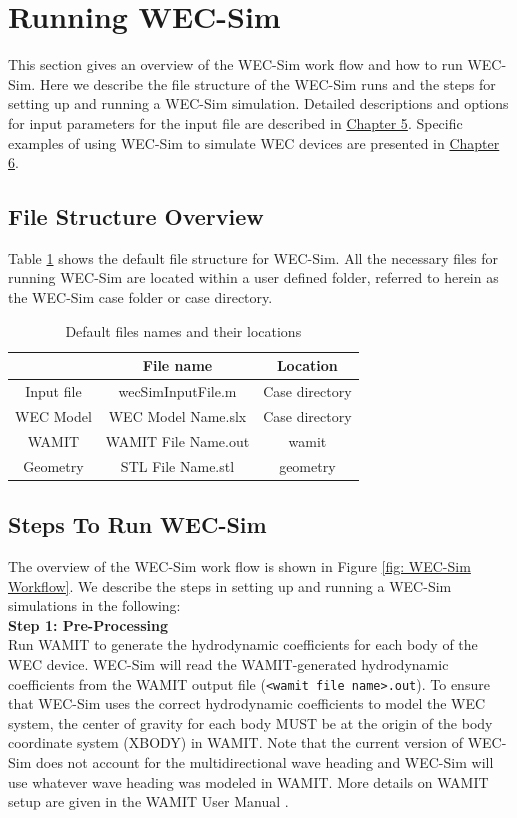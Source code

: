 \section{Running WEC-Sim} \label{sec:running}
This section gives an overview of the WEC-Sim work flow and how to run WEC-Sim. Here we describe the file structure of the WEC-Sim runs and the steps for setting up and running a WEC-Sim simulation. Detailed descriptions and options for input parameters for the input file are described in \hyperlink{chapter.5}{Chapter 5}. Specific examples of using WEC-Sim to simulate WEC devices are presented in \hyperlink{chapter.6}{Chapter 6}. 

\subsection{File Structure Overview} \label{sec:fileStructure}
Table \ref{Table: List of default file name and location} shows the default file structure for WEC-Sim. All the necessary files for running WEC-Sim are located within a user defined folder, referred to herein as the WEC-Sim case folder or case directory.

\begin{table}[H]
\noindent \centering{}
\protect\caption{Default files names and their locations}
\begin{tabular}{|c|c|c|}
\hline 
 & \textbf{File name} & \textbf{Location}\tabularnewline
\hline 
Input file & wecSimInputFile.m & Case directory\tabularnewline
\hline 
WEC Model & WEC Model Name.slx & Case directory\tabularnewline
\hline 
WAMIT & WAMIT File Name.out & wamit\tabularnewline
\hline 
Geometry & STL File Name.stl & geometry\tabularnewline
\hline 
\end{tabular}
\label{Table: List of default file name and location}
\end{table}

\subsection{Steps To Run WEC-Sim} \label{sec:stepRunning}
The overview of the WEC-Sim work flow is shown in Figure \ref{fig: WEC-Sim Workflow}. We describe the steps in setting up and running a WEC-Sim simulations in the following:\\

\textbf{Step 1: Pre-Processing}\\
Run WAMIT to generate the hydrodynamic coefficients for each body of the WEC device. WEC-Sim will read the WAMIT-generated hydrodynamic coefficients from the WAMIT output file (\texttt{<wamit file name>.out}). To ensure that WEC-Sim uses the correct hydrodynamic coefficients to model the WEC system, the center of gravity for each body MUST be at the origin of the body coordinate system (XBODY) in WAMIT. Note that the current version of WEC-Sim does not account for the multidirectional wave heading and WEC-Sim will use whatever wave heading was modeled in WAMIT. More details on WAMIT setup are given in the WAMIT User Manual \cite{Lee2006}.

